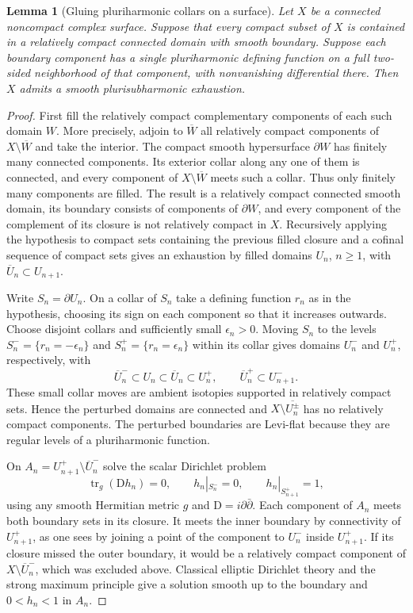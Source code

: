 \documentclass[11pt]{amsart}
\newtheorem{lemma}[theorem]{Lemma}
\theoremstyle{remark}
\numberwithin{equation}{section}
\newcommand{\D}{\mathrm{D}}
\begin{document}
\begin{lemma}[Gluing pluriharmonic collars on a surface]\label{lem:annuli}
Let $X$ be a connected noncompact complex surface. Suppose that every
compact subset of $X$ is contained in a relatively compact connected
domain with smooth boundary. Suppose each boundary component has a
single pluriharmonic defining function on a full two-sided neighborhood
of that component, with nonvanishing differential there.
Then $X$ admits a smooth plurisubharmonic exhaustion.
\end{lemma}

\begin{proof}
First fill the relatively compact complementary components of each such
domain $W$. More precisely, adjoin to $\overline W$ all relatively
compact components of $X\setminus\overline W$ and take the interior.
The compact smooth hypersurface $\partial W$ has finitely many connected
components. Its exterior collar along any one of them is connected, and
every component of $X\setminus\overline W$ meets such a collar. Thus
only finitely many components are filled. The result is a relatively
compact connected smooth domain, its boundary consists of components of
$\partial W$, and every component of the complement of its closure is
not relatively compact in $X$. Recursively applying the hypothesis to
compact sets containing the previous filled closure and a cofinal
sequence of compact sets gives an exhaustion by filled domains $U_n$,
$n\geq 1$, with $\overline U_n\subset U_{n+1}$.

Write $S_n=\partial U_n$. On a collar of $S_n$ take a defining
function $r_n$ as in the hypothesis, choosing its sign on each component
so that it increases outwards. Choose disjoint collars and sufficiently
small $\epsilon_n>0$. Moving $S_n$ to the levels
$S_n^-=\{r_n=-\epsilon_n\}$ and $S_n^+=\{r_n=\epsilon_n\}$ within
its collar gives domains $U_n^-$ and $U_n^+$, respectively, with
\[
 \overline U_n^-\subset U_n\subset\overline U_n\subset U_n^+,
 \qquad \overline U_n^+\subset U_{n+1}^-.
\]
These small collar moves are ambient isotopies supported in relatively
compact sets. Hence the perturbed domains are connected and
$X\setminus\overline{U_n^\pm}$ has no
relatively compact components. The perturbed boundaries are Levi-flat
because they are regular levels of a pluriharmonic function.

On $A_n=U_{n+1}^+\setminus\overline U_n^-$ solve the scalar Dirichlet
problem
\[
 \operatorname{tr}_{g}(\D h_n)=0,\qquad
 h_n|_{S_n^-}=0,\qquad h_n|_{S_{n+1}^+}=1,
\]
using any smooth Hermitian metric $g$ and $\D=i\partial\bar\partial$.
Each component of $A_n$ meets both boundary sets in its closure. It
meets the inner boundary by connectivity of $U_{n+1}^+$, as one sees by
joining a point of the component to $U_n^-$ inside $U_{n+1}^+$.
If its closure missed the outer boundary, it would be a relatively
compact component of $X\setminus\overline U_n^-$, which was excluded
above. Classical elliptic Dirichlet theory and the strong maximum
principle give a solution smooth up to the boundary and $0<h_n<1$ in
$A_n$.


\end{proof}
\end{document}
